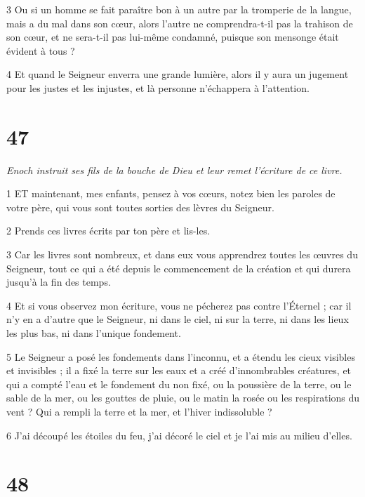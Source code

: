 \par 3 Ou si un homme se fait paraître bon à un autre par la tromperie de la langue, mais a du mal dans son cœur, alors l'autre ne comprendra-t-il pas la trahison de son cœur, et ne sera-t-il pas lui-même condamné, puisque son mensonge était évident à tous ?

\par 4 Et quand le Seigneur enverra une grande lumière, alors il y aura un jugement pour les justes et les injustes, et là personne n'échappera à l'attention.

\chapter{47}

\par \textit{Enoch instruit ses fils de la bouche de Dieu et leur remet l'écriture de ce livre.}

\par 1 ET maintenant, mes enfants, pensez à vos cœurs, notez bien les paroles de votre père, qui vous sont toutes sorties des lèvres du Seigneur.

\par 2 Prends ces livres écrits par ton père et lis-les.

\par 3 Car les livres sont nombreux, et dans eux vous apprendrez toutes les œuvres du Seigneur, tout ce qui a été depuis le commencement de la création et qui durera jusqu'à la fin des temps.

\par 4 Et si vous observez mon écriture, vous ne pécherez pas contre l'Éternel ; car il n'y en a d'autre que le Seigneur, ni dans le ciel, ni sur la terre, ni dans les lieux les plus bas, ni dans l'unique fondement.

\par 5 Le Seigneur a posé les fondements dans l'inconnu, et a étendu les cieux visibles et invisibles ; il a fixé la terre sur les eaux et a créé d'innombrables créatures, et qui a compté l'eau et le fondement du non fixé, ou la poussière de la terre, ou le sable de la mer, ou les gouttes de pluie, ou le matin la rosée ou les respirations du vent ? Qui a rempli la terre et la mer, et l'hiver indissoluble ?

\par 6 J'ai découpé les étoiles du feu, j'ai décoré le ciel et je l'ai mis au milieu d'elles.

\chapter{48}

